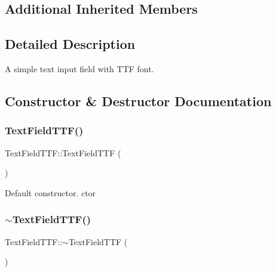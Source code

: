 \subsection*{Additional Inherited Members}


\subsection{Detailed Description}
A simple text input field with T\+TF font. 

\subsection{Constructor \& Destructor Documentation}
\mbox{\label{classTextFieldTTF_a1173212d59fdbbaf51d08aff9981a4bb}} 
\subsubsection{\texorpdfstring{Text\+Field\+T\+T\+F()}{TextFieldTTF()}\hspace{0.1cm}{\footnotesize\ttfamily [1/2]}}
{\footnotesize\ttfamily Text\+Field\+T\+T\+F\+::\+Text\+Field\+T\+TF (\begin{DoxyParamCaption}{ }\end{DoxyParamCaption})}

Default constructor.  ctor \mbox{\label{classTextFieldTTF_a21e791b86e551a133db6321bb6b6953c}} 
\subsubsection{\texorpdfstring{$\sim$\+Text\+Field\+T\+T\+F()}{~TextFieldTTF()}\hspace{0.1cm}{\footnotesize\ttfamily [1/2]}}
{\footnotesize\ttfamily Text\+Field\+T\+T\+F\+::$\sim$\+Text\+Field\+T\+TF (\begin{DoxyParamCaption}{ }\end{DoxyParamCaption})\hspace{0.3cm}{\ttfamily [virtual]}}

